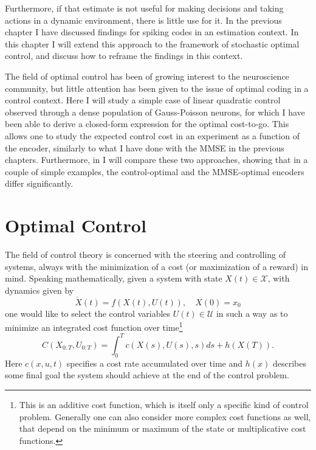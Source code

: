  Furthermore, if that estimate is not useful for making decisions and taking actions 
in a dynamic environment, there is little use for it. In the previous chapter I have discussed findings for spiking codes in an estimation context. In this chapter I will extend this approach 
to the framework of stochastic optimal control, and discuss how to reframe the findings in this context.\par

The field of optimal control has been of growing interest to the neuroscience community, but little attention has been given to the issue of optimal coding in a control context. Here I
will study a simple case of linear quadratic control observed through a dense population of Gauss-Poisson neurons, for which I have been able to derive a closed-form expression
for the optimal cost-to-go. This allows one to study the expected control cost in an experiment as a function of the encoder, similarly to what I have done with the MMSE in the previous 
chapters. Furthermore, in  I will compare these two approaches, showing that in a couple of simple examples, the control-optimal and the MMSE-optimal encoders
differ significantly.

\section{Optimal Control}
The field of control theory is concerned with the steering and controlling of systems, always with the minimization of a cost (or maximization of a reward) in mind. Speaking mathematically, given a system with state $X(t) \in \mathcal{X}$, with dynamics given by
$$
\dot{X}(t) = f(X(t),U(t)), \quad X(0) = x_0
$$
one would like to select the control variables $U(t) \in \mathcal{U}$ in such a way as to minimize an integrated cost function over time\footnote{This is an additive cost function,
which is itself only a specific kind of control problem. Generally one can also consider more complex cost functions as well, that depend on the minimum or maximum
of the state or multiplicative cost functions.}
$$
C(X_{0:T},U_{0:T}) = \int_{0}^T c(X(s),U(s),s) ds + h(X(T)).
$$
Here $c(x,u,t)$ specifies a cost rate accumulated over time and $h(x)$ describes some final goal the system should achieve at the end of the control problem.\par

